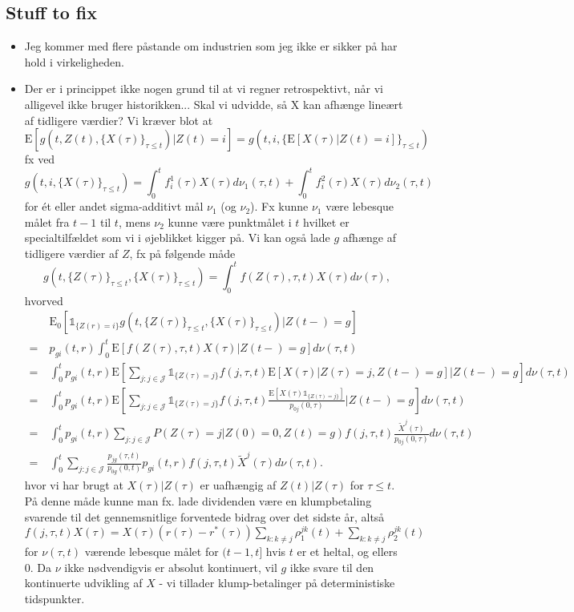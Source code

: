 \documentclass[12pt]{article}
\newcommand{\E}{\text{E}}
\newcommand{\indic}[1]{\mathds{1}_{ \{ #1 \} }}
\theoremstyle{my_thm}
\theoremstyle{my_rem}
\begin{document}
\subsection*{Stuff to fix}
\begin{itemize}
\item Jeg kommer med flere påstande om industrien som jeg ikke er sikker på har hold i virkeligheden.
\item Der er i princippet ikke nogen grund til at vi regner retrospektivt, når vi alligevel ikke bruger historikken... Skal vi udvidde, så X kan afhænge lineært af tidligere værdier? Vi kræver blot at
$$
\E[g(t,Z(t),\{ X(\tau) \}_{\tau\leq t})|Z(t)=i]=g(t,i,\{ \E[X(\tau)|Z(t)=i] \}_{\tau \leq t})$$
fx ved
$$
g(t,i,\{X(\tau)\}_{\tau \leq t})=\int_0^t f^1_i(\tau) X(\tau) d\nu_1(\tau,t) + \int_0^t f^2_i(\tau) X(\tau) d\nu_2(\tau,t)
$$
for ét eller andet sigma-additivt mål $\nu_1$ (og $\nu_2$). Fx kunne $\nu_1$ være lebesque målet fra $t-1$ til $t$, mens $\nu_2$ kunne være punktmålet i $t$ hvilket er specialtilfældet som vi i øjeblikket kigger på. Vi kan også lade $g$ afhænge af tidligere værdier af $Z$, fx på følgende måde
$$
g(t,\{Z(\tau)\}_{\tau\leq t},\{X(\tau)\}_{\tau\leq t})=
\int_0^t f(Z(\tau),\tau,t) X(\tau) d\nu(\tau),
$$
hvorved
\begin{align*}
&\E_0[\indic{Z(r)=i}g(t,\{Z(\tau)\}_{\tau\leq t},\{X(\tau)\}_{\tau\leq t})|Z(t-)=g]
\\
= \ &
p_{gi}(t,r)\int_0^t \E[ f(Z(\tau),\tau,t) X(\tau)|Z(t-)=g] d\nu(\tau,t)
\\
= \ &
\int_0^t p_{gi}(t,r) \E \left[ \sum_{j:j \in \mathcal{J}}  \indic{Z(\tau)=j} f(j,\tau,t) \E[X(\tau)|Z(\tau)=j,Z(t-)=g] \bigg| Z(t-)=g \right] d\nu(\tau,t)
\\
= \ &
\int_0^t p_{gi}(t,r) \E \left[ \sum_{j:j \in \mathcal{J}}  \indic{Z(\tau)=j} f(j,\tau,t) \frac{\E[X(\tau)\indic{Z(\tau)=j}]}{p_{0j}(0,\tau)} \bigg| Z(t-)=g \right] d\nu(\tau,t)
\\
= \ &
\int_0^t p_{gi}(t,r) \sum_{j:j \in \mathcal{J}}  P(Z(\tau)=j|Z(0)=0,Z(t)=g) f(j,\tau,t) \frac{\tilde{X}^j(\tau)}{p_{0j}(0,\tau)}  d\nu(\tau,t)
\\
= \ &
\int_0^t \sum_{j:j \in \mathcal{J}} \frac{p_{jg}(\tau,t)}{p_{0g}(0,t)} p_{gi}(t,r) f(j,\tau,t) \tilde{X}^j(\tau) d\nu(\tau,t).
\end{align*}
hvor vi har brugt at $X(\tau)|Z(\tau)$ er uafhængig af $Z(t)|Z(\tau)$ for $\tau\leq t$. På denne måde kunne man fx. lade dividenden være en klumpbetaling svarende til det gennemsnitlige forventede bidrag over det sidste år, altså $f(j,\tau,t)X(\tau)=X(\tau)(r(\tau)-r^*(\tau))\sum_{k:k\neq j} \rho_1^{jk}(t)+\sum_{k:k\neq j} \rho_2^{jk}(t)$ for $\nu(\tau,t)$ værende lebesque målet for $(t-1,t]$ hvis $t$ er et heltal, og ellers 0. Da $\nu$ ikke nødvendigvis er absolut kontinuert, vil $g$ ikke svare til den kontinuerte udvikling af $X$ - vi tillader klump-betalinger på deterministiske tidspunkter.

\end{itemize}
\end{document}
